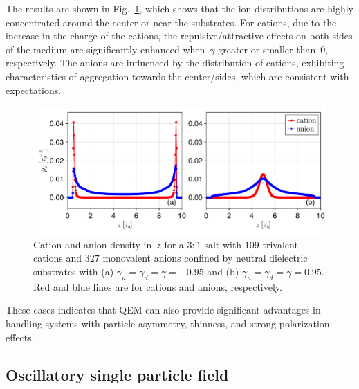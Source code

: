 The results are shown in Fig.~\ref{fig:salt3-1}, which shows that the ion distributions are highly concentrated around the center or near the substrates.
For cations, due to the increase in the charge of the cations, the repulsive/attractive effects on both sides of the medium are significantly enhanced when~$\gamma$ greater or smaller than~$0$, respectively.
The anions are influenced by the distribution of cations, exhibiting characteristics of aggregation towards the center/sides, which are consistent with expectations.

\begin{figure}[htbp]
  \centering
  \includegraphics[width = \linewidth]{figs/density_3-1.pdf}

  \caption{
    Cation and anion density in~$z$ for a $3:1$ salt with $109$ trivalent cations and $327$ monovalent anions confined by neutral dielectric substrates with (a) $\gamma_u = \gamma_d = \gamma = - 0.95$ and (b) $\gamma_u = \gamma_d = \gamma = 0.95$.
    Red and blue lines are for cations and anions, respectively.
  }
    \label{fig:salt3-1}
\end{figure}

These cases indicates that QEM can also provide significant advantages in handling systems with particle asymmetry, thinness, and strong polarization effects.


\subsection{Oscillatory single particle field}

